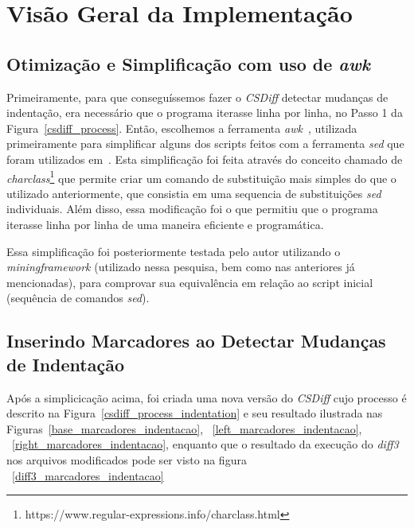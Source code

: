 \section{Visão Geral da Implementação}\label{implementacao}
\subsection{Otimização e Simplificação com uso de \emph{awk}}

Primeiramente, para que conseguíssemos fazer o \emph{CSDiff} detectar mudanças
de indentação, era necessário que o programa iterasse linha por linha, no Passo
1 da Figura~\ref{csdiff_process}. Então, escolhemos a ferramenta
\emph{awk}~\cite{awk}, utilizada primeiramente para simplificar alguns dos
scripts feitos com a ferramenta \emph{sed} que foram utilizados
em~\cite{clem21,heitor21}. Esta simplificação foi feita através do conceito
chamado de
\emph{charclass}\footnote{https://www.regular-expressions.info/charclass.html}
que permite criar um comando de substituição mais simples do que o utilizado
anteriormente, que consistia em uma sequencia de substituições \emph{sed}
individuais. Além disso, essa modificação foi o que permitiu que o programa
iterasse linha por linha de uma maneira eficiente e programática.

Essa simplificação foi posteriormente testada pelo autor utilizando o
\emph{miningframework} (utilizado nessa pesquisa, bem como nas anteriores já
mencionadas), para comprovar sua equivalência em relação ao script inicial
(sequência de comandos \emph{sed}).

\subsection{Inserindo Marcadores ao Detectar Mudanças de Indentação}

Após a simplicicação acima, foi criada uma nova versão do \emph{CSDiff} cujo
processo é descrito na Figura~\ref{csdiff_process_indentation} e seu resultado
ilustrada nas Figuras~\ref{base_marcadores_indentacao},
~\ref{left_marcadores_indentacao}, ~\ref{right_marcadores_indentacao}, enquanto
que o resultado da execução do \emph{diff3} nos arquivos modificados pode
ser visto na figura ~\ref{diff3_marcadores_indentacao}


